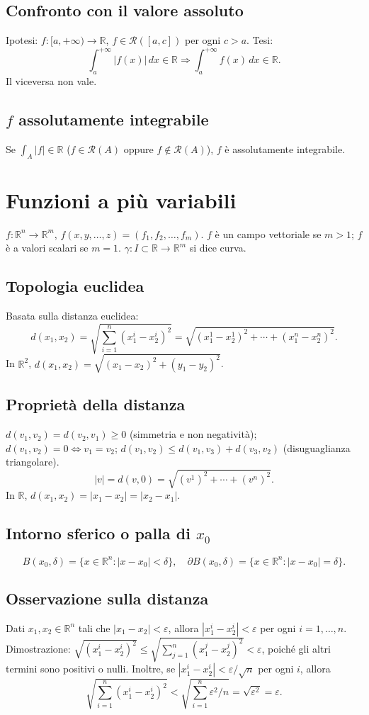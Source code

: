 \documentclass[11pt,a4paper]{article}
\newcommand{\R}{\mathbb R}\newcommand{\N}{\mathbb N}\newcommand{\pagina}[1]{\clearpage}
\begin{document}
\subsection*{Confronto con il valore assoluto}
Ipotesi: $f:[a,+\infty)\to\R$, $f\in\mathcal R([a,c])$ per ogni $c>a$.
Tesi:
\[\int_a^{+\infty}|f(x)|\,dx\in\R\Rightarrow\int_a^{+\infty}f(x)\,dx\in\R.\]
Il viceversa non vale.
\subsection*{$f$ assolutamente integrabile}
Se $\int_A|f|\in\R$ ($f\in\mathcal R(A)$ oppure $f\notin\mathcal R(A)$), $f$ è assolutamente integrabile.
\section*{Funzioni a più variabili}
$f:\R^n\to\R^m$, $f(x,y,\ldots,z)=(f_1,f_2,\ldots,f_m)$.
$f$ è un campo vettoriale se $m>1$; $f$ è a valori scalari se $m=1$.
$\gamma:I\subset\R\to\R^m$ si dice curva.
\subsection*{Topologia euclidea}
Basata sulla distanza euclidea:
\[d(x_1,x_2)=\sqrt{\sum_{i=1}^n(x_1^i-x_2^i)^2}=\sqrt{(x_1^1-x_2^1)^2+\cdots+(x_1^n-x_2^n)^2}.\]
In $\R^2$, $d(x_1,x_2)=\sqrt{(x_1-x_2)^2+(y_1-y_2)^2}$.
\pagina{10}
\subsection*{Proprietà della distanza}
$d(v_1,v_2)=d(v_2,v_1)\ge0$ (simmetria e non negatività);
$d(v_1,v_2)=0\iff v_1=v_2$;
$d(v_1,v_2)\le d(v_1,v_3)+d(v_3,v_2)$ (disuguaglianza triangolare).
\[|v|=d(v,0)=\sqrt{(v^1)^2+\cdots+(v^n)^2}.\]
In $\R$, $d(x_1,x_2)=|x_1-x_2|=|x_2-x_1|$.
\subsection*{Intorno sferico o palla di $x_0$}
\[B(x_0,\delta)=\{x\in\R^n:|x-x_0|<\delta\},\quad\partial B(x_0,\delta)=\{x\in\R^n:|x-x_0|=\delta\}.\]
\subsection*{Osservazione sulla distanza}
Dati $x_1,x_2\in\R^n$ tali che $|x_1-x_2|<\varepsilon$, allora $|x_1^i-x_2^i|<\varepsilon$ per ogni $i=1,\ldots,n$.
Dimostrazione: $\sqrt{(x_1^i-x_2^i)^2}\le\sqrt{\sum_{j=1}^n(x_1^j-x_2^j)^2}<\varepsilon$, poiché gli altri termini sono positivi o nulli.
Inoltre, se $|x_1^i-x_2^i|<\varepsilon/\sqrt n$ per ogni $i$, allora
\[\sqrt{\sum_{i=1}^n(x_1^i-x_2^i)^2}<\sqrt{\sum_{i=1}^n\varepsilon^2/n}=\sqrt{\varepsilon^2}=\varepsilon.\]
\pagina{11}
\end{document}
